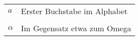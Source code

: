     \begin{table}[h]
        \begin{tabular}{@{}ll@{}}%
            \(a\) & Erster Buchstabe im Alphabet\\
            & \\
            \(\alpha\) & Im Gegensatz etwa zum Omega\\
    \end{tabular}\label{tab:glossar}
    \end{table}